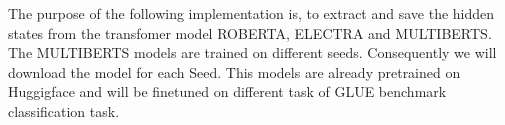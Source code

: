 The purpose of the following implementation is, to extract and save the hidden states from the transfomer model {ROBERTA}, {ELECTRA} and {MULTIBERTS}.
The {MULTIBERTS} models are trained on different seeds.
Consequently we will download the model for each Seed.
This models are already pretrained on Huggigface and will be finetuned on different task of GLUE benchmark classification task.
%
%

